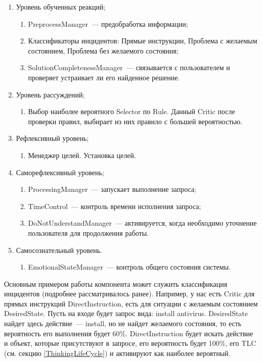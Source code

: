 \begin{enumerate}
	\item Уровень обученных реакций;
	\begin{enumerate}
		\item PreprocessManager~--- предобработка информации;
		\item Классификаторы инцидентов: Прямые инструкции, Проблема с желаемым состоянием, Проблема без желаемого состояния;
		\item SolutionCompletenessManager~--- связывается с пользователем и проверяет устраивает ли его найденное решение.
	\end{enumerate}
	\item Уровень рассуждений;
	\begin{enumerate}
		\item Выбор наиболее вероятного Selector по Rule. Данный Critic после проверки правил, выбирает из них правило с большей вероятностью.
	\end{enumerate}
	\item Рефлексивный уровень;
	\begin{enumerate}
		\item Менеджер целей. Установка целей.
	\end{enumerate}
	\item Саморефлексивный уровень;
	\begin{enumerate}
		\item ProcessingManager~--- запускает выполнение запроса;
		\item TimeControl~--- контроль времени исполнения запроса;
		\item DoNotUnderstandManager~--- активируется, когда необходимо уточнение пользователя для продолжения работы.
	\end{enumerate}
	\item Самосознательный уровень.
	\begin{enumerate}
		\item EmotionalStateManager~--- контроль общего состояния системы.
	\end{enumerate} 
\end{enumerate} \par
Основным примером работы компонента может служить классификация инцидентов (подробнее рассматривалось ранее). Например, у нас есть Critic для прямых инструкций DirectInstruction, есть для ситуации с желаемым состоянием DesiredState. Пусть на входе будет запрос вида: install antivirus. DesiredState найдет здесь действие~--- install, но не найдет желаемого состояния, то есть вероятность его выполнения будет 60\%. DirectInstruction будет искать действие и объект, которые присутствуют в запросе, его вероятность будет 100\%, его TLC (см. секцию \ref{ThinkingLifeCycle}) и активируют как наиболее вероятный. \par
